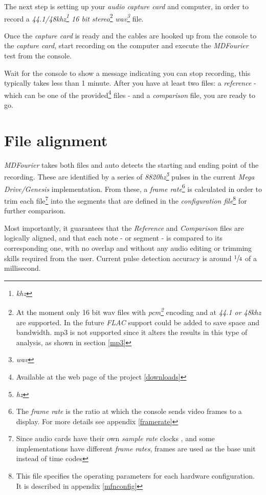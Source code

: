 \documentclass[10pt,a4paper]{report}
\newcommand{\define}[1]{\textit{\acrshort{#1}\footnote{\textit{\acrlong{#1}}}}}
\newcommand{\fkhz}[1]{\textit{#1\acrshort{khz}}}
\begin{document}
The next step is setting up your \textit{audio capture card} and computer, in order to record a \textit{44.1/48\define{khz} 16 bit stereo}\footnote{At the moment only 16 bit \acrshort{wav} files with \define{pcm} encoding and at \fkhz{44.1 or 48} are supported. In the future \textit{FLAC} support could be added to save space and bandwidth. \acrshort{mp3} is not supported since it alters the results in this type of analysis, as shown in section \ref{mp3}} \define{wav} file.

Once the \textit{capture card} is ready and the cables are hooked up from the console to the \textit{capture card}, start recording on the computer and execute the \textit{MDFourier} test from the console.

Wait for the console to show a message indicating you can stop recording, this typically takes less than 1 minute. After you have at least two files: a \textit{reference} - which can be one of the provided\footnote{Available at the web page of the project \ref{downloads}} files -  and a \textit{comparison} file, you are ready to go. 

\section{File alignment}

\textit{MDFourier} takes both files and auto detects the starting and ending point of the recording. These are identified by a series of \textit{8820}\define{hz} pulses in the current \textit{Mega Drive/Genesis} implementation. From these, a \textit{frame rate}\footnote{The \textit{frame rate} is the ratio at which the console sends video frames to a display. For more details see appendix \ref{framerate}} is calculated in order to trim each file\footnote{Since audio cards have their own \textit{sample rate} clocks \cite{SoundCardClock} \cite{soundcardtiming} \cite{gwsoundcardtiming}, and some implementations have different \textit{frame rates}, frames are used as the base unit instead of time codes} into the segments that are defined in the \textit{configuration file}\footnote{This file specifies the operating parameters for each hardware configuration. It is described in appendix \ref{mfnconfig}} for further comparison.

Most importantly, it guarantees that the \textit{Reference} and \textit{Comparison} files are logically aligned, and that each note - or segment - is compared to its corresponding one, with no overlap and without any audio editing or trimming skills required from the user. Current pulse detection accuracy is around $\sfrac{1}{4}$ of a millisecond.
\end{document}
